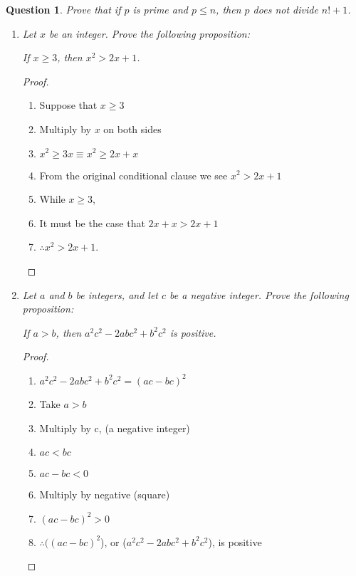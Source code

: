 \documentclass[11pt,oneside]{article}
\newtheorem{question}{Question}
\begin{document}
\bigskip

\begin{question}
    Prove that if $p$ is prime and $p \leq n$, then $p$ does not divide $n! + 1$.
\end{question}


\begin{enumerate}
    \item \textit{Let $x$ be an integer. Prove the following proposition:} \\
      \centerline{\textit{If $x \geq 3$, then $x^2 > 2x+1$.}}
      \begin{proof}
          \begin{enumerate}
              \item Suppose that $x \geq 3$
              \item Multiply by $x$ on both sides
              \item $x^2 \geq 3x \equiv x^2 \geq 2x + x$
              \item From the original conditional clause we see $x^2 > 2x + 1$
              \item While $x \geq 3$,
              \item It must be the case that $2x + x > 2x + 1$
              \item $\therefore x^2 > 2x+1$.
          \end{enumerate}
      \end{proof}
    \item \textit{Let $a$ and $b$ be integers, and let $c$ be a negative integer. Prove the following proposition:} \\
      \centerline{\textit{If $a > b$, then $a^2c^2-2abc^2+b^2c^2$ is positive.}}
      \begin{proof}
          \begin{enumerate}
              \item $a^2c^2-2abc^2+b^2c^2 = (ac-bc)^2$
              \item Take $a > b$
              \item Multiply by c, (a negative integer)
              \item $ac < bc$
              \item $ac - bc < 0$
              \item Multiply by negative (square)
              \item $(ac - bc)^2 > 0$
              \item $\therefore ((ac-bc)^2$), or ($a^2c^2-2abc^2+b^2c^2$), is positive
          \end{enumerate}
      \end{proof}

\end{enumerate}
\end{document}
